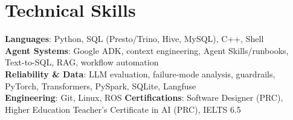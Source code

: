 \documentclass[letterpaper,10pt]{article}
\begin{document}
\section{Technical Skills}
\begin{itemize}[leftmargin=0.15in,label={}]
  \small{\item{
    \textbf{Languages}{: Python, SQL (Presto/Trino, Hive, MySQL), C++, Shell} \\
    \textbf{Agent Systems}{: Google ADK, context engineering, Agent Skills/runbooks, Text-to-SQL, RAG, workflow automation} \\
    \textbf{Reliability \& Data}{: LLM evaluation, failure-mode analysis, guardrails, PyTorch, Transformers, PySpark, SQLite, Langfuse} \\
    \textbf{Engineering}{: Git, Linux, ROS} \quad
    \textbf{Certifications}{: Software Designer (PRC), Higher Education Teacher's Certificate in AI (PRC), IELTS 6.5}
  }}
\end{itemize}
\vspace{-16pt}
\end{document}
